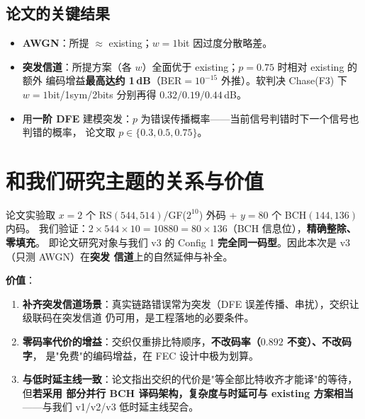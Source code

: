 \documentclass[11pt,a4paper]{article}
\begin{document}
\subsection{论文的关键结果}

\begin{itemize}[leftmargin=1.5em, itemsep=1pt]
\item \textbf{AWGN}：所提 $\approx$ existing；$w{=}1$bit 因过度分散略差。
\item \textbf{突发信道}：所提方案（各 $w$）全面优于 existing；$p{=}0.75$ 时相对 existing 的额外
      编码增益\textbf{最高达约 1\,dB}（BER$=10^{-15}$ 外推）。软判决 Chase(F3) 下
      $w{=}1$bit/1sym/2bits 分别再得 $0.32/0.19/0.44$\,dB。
\item 用\textbf{一阶 DFE} 建模突发：$p$ 为错误传播概率——当前信号判错时下一个信号也判错的概率，
      论文取 $p\in\{0.3,0.5,0.75\}$。
\end{itemize}

\section{和我们研究主题的关系与价值}

\begin{resultbox}[title=\textbf{关系：论文码型 = 我们的 Config 1（KP4）}]
论文实验取 $x{=}2$ 个 RS$(544,514)$/GF($2^{10}$) 外码 + $y{=}80$ 个 BCH$(144,136)$ 内码。
我们验证：$2\times544\times10 = 10880 = 80\times136$（BCH 信息位），\textbf{精确整除、零填充}。
即论文研究对象与我们 v3 的 Config 1 \textbf{完全同一码型}。因此本次是 v3（只测 AWGN）在\textbf{突发
信道}上的自然延伸与补全。
\end{resultbox}

\textbf{价值}：
\begin{enumerate}[leftmargin=1.6em, itemsep=2pt]
\item \textbf{补齐突发信道场景}：真实链路错误常为突发（DFE 误差传播、串扰），交织让级联码在突发信道
      仍可用，是工程落地的必要条件。
\item \textbf{零码率代价的增益}：交织仅重排比特顺序，\textbf{不改码率（$0.892$ 不变）、不改码字}，
      是"免费"的编码增益，在 FEC 设计中极为划算。
\item \textbf{与低时延主线一致}：论文指出交织的代价是"等全部比特收齐才能译"的等待，但\textbf{若采用
      部分并行 BCH 译码架构，复杂度与时延可与 existing 方案相当}——与我们 v1/v2/v3 低时延主线契合。
\end{enumerate}

\end{document}
